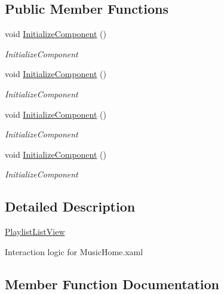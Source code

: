\subsection*{Public Member Functions}
\begin{DoxyCompactItemize}
\item 
void \hyperlink{class_presentation_1_1_view_1_1_list_1_1_playlist_list_view_aa9bf1ecd779db592df3c013a92d6e218}{Initialize\+Component} ()
\begin{DoxyCompactList}\small\item\em Initialize\+Component \end{DoxyCompactList}\item 
void \hyperlink{class_presentation_1_1_view_1_1_list_1_1_playlist_list_view_aa9bf1ecd779db592df3c013a92d6e218}{Initialize\+Component} ()
\begin{DoxyCompactList}\small\item\em Initialize\+Component \end{DoxyCompactList}\item 
void \hyperlink{class_presentation_1_1_view_1_1_list_1_1_playlist_list_view_aa9bf1ecd779db592df3c013a92d6e218}{Initialize\+Component} ()
\begin{DoxyCompactList}\small\item\em Initialize\+Component \end{DoxyCompactList}\item 
void \hyperlink{class_presentation_1_1_view_1_1_list_1_1_playlist_list_view_aa9bf1ecd779db592df3c013a92d6e218}{Initialize\+Component} ()
\begin{DoxyCompactList}\small\item\em Initialize\+Component \end{DoxyCompactList}\end{DoxyCompactItemize}


\subsection{Detailed Description}
\hyperlink{class_presentation_1_1_view_1_1_list_1_1_playlist_list_view}{Playlist\+List\+View} 

Interaction logic for Music\+Home.\+xaml 

\subsection{Member Function Documentation}
\mbox{\label{class_presentation_1_1_view_1_1_list_1_1_playlist_list_view_aa9bf1ecd779db592df3c013a92d6e218}} 
